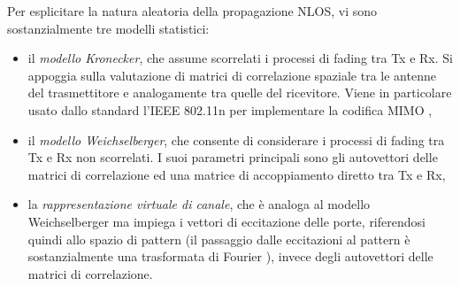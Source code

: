 \documentclass[technote]{IEEEtran}
\begin{document}
\par Per esplicitare la natura aleatoria della propagazione NLOS, vi sono sostanzialmente tre modelli statistici:
\begin{itemize}
\item il \textit{modello Kronecker}, che assume scorrelati i processi di fading tra Tx e Rx. Si appoggia sulla valutazione di matrici di correlazione spaziale tra le antenne del trasmettitore e analogamente tra quelle del ricevitore. Viene in particolare usato dallo standard l'IEEE 802.11n per implementare la codifica MIMO \cite{IEEE80211n},
\item il \textit{modello Weichselberger}, che consente di considerare i processi di fading tra Tx e Rx non scorrelati. I suoi parametri principali sono gli autovettori delle matrici di correlazione ed una matrice di accoppiamento diretto tra Tx e Rx,
\item la \textit{rappresentazione virtuale di canale}, che è analoga al modello Weichselberger ma impiega i vettori di eccitazione delle porte, riferendosi quindi allo spazio di pattern (il passaggio dalle eccitazioni al pattern è sostanzialmente una trasformata di Fourier \cite{Balanis}), invece degli autovettori delle matrici di correlazione.
\end{itemize}
\end{document}
